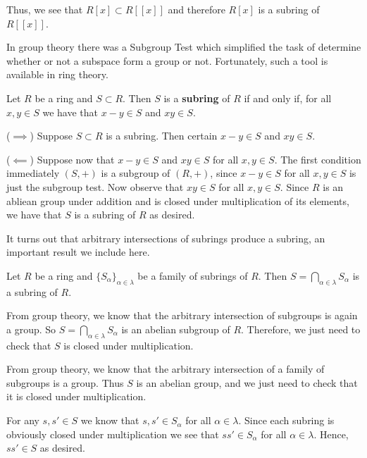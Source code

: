     Thus, we see that $R[x] \subset R[[x]]$ and therefore $R[x]$
    is a subring of $R[[x]]$.

    In group theory there was a Subgroup Test which simplified the
    task of determine whether or not a subspace form a group or
    not. Fortunately, such a tool is available in ring theory.

    \begin{thm}
        Let $R$ be a ring and $S \subset R$. Then $S$ is a
        \textbf{subring} of $R$ if and only if, for all $x, y \in
        S$ we have that $x - y \in S$ and $xy \in S$.
    \end{thm}

    \begin{prf}
        ($\implies$) Suppose $S \subset R$ is a subring. Then
        certain $x - y \in S$ and $xy \in S$. 

        ($\impliedby$) Suppose now that $x - y \in S$ and $xy \in
        S$ for all $x, y \in S$. The first condition immediately
        $(S, +)$ is a subgroup of $(R, +)$, since $x - y \in S$
        for all $x, y \in S$ is just the subgroup test. Now observe that $xy \in S$ for all $x, y \in S$.
        Since $R$ is an abliean group under addition and is closed
        under multiplication of its elements, we have that $S$ is
        a subring of $R$ as desired.
    \end{prf}

    It turns out that arbitrary intersections of subrings produce
    a subring, an important result we include here. 

    \begin{thm}\label{subring_intersections}
        Let $R$ be a ring and $\{S_\alpha\}_{\alpha \in \lambda}$
        be a family of subrings of $R$. Then $S = \bigcap_{\alpha
        \in \lambda} S_\alpha$ is a subring of $R$. 
    \end{thm}

    \begin{prf}
        From group theory, we know that the arbitrary intersection
        of subgroups is again a group. So $S = \bigcap_{\alpha \in
        \lambda} S_\alpha$ is an abelian subgroup of $R$. 
        Therefore, we just need to
        check that $S$ is
        closed under multiplication. 

        From group theory, we know that the arbitrary
        intersection of a family of subgroups is a group. Thus $S$
        is an abelian group, and we just need to check that it is
        closed under multiplication. 

        For any $s, s' \in S$ we know that $s, s' \in S_\alpha$
        for all $\alpha \in \lambda$. Since each subring is
        obviously closed under multiplication we see that $ss' \in
        S_\alpha$ for all $\alpha \in \lambda$. Hence, $ss' \in S$
        as desired.
    \end{prf}

